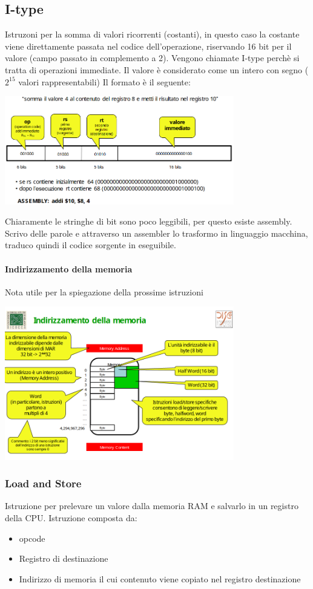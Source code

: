 \documentclass[12pt, a4paper, openany]{book}
\begin{document}
\subsection{I-type}
Istruzoni per la somma di valori ricorrenti (costanti), in questo caso la costante viene direttamente
passata nel codice dell'operazione, riservando 16 bit per il valore (campo passato in complemento a 2).
Vengono chiamate I-type perchè si tratta di operazioni immediate.
Il valore è considerato come un intero con segno ($2^{15}$ valori rappresentabili)
Il formato è il seguente:
\begin{center}
    \includegraphics[width=100mm, scale=0.5]{I-type format.png}
\end{center}
Chiaramente le stringhe di bit sono poco leggibili, per questo esiste assembly.
Scrivo delle parole e attraverso un assembler lo trasformo in linguaggio macchina, traduco
quindi il codice sorgente in eseguibile.
\paragraph{Indirizzamento della memoria} Nota utile per la spiegazione della prossime istruzioni
\begin{center}
    \includegraphics[width=100mm, scale=0.5]{assembly indirizzamento memoria.png}
\end{center}

\subsubsection*{Load and Store}
Istruzione per prelevare un valore dalla memoria RAM e salvarlo in un registro della CPU.
Istruzione composta da:
\begin{itemize}
    \item opcode
    \item Registro di destinazione
    \item Indirizzo di memoria il cui contenuto viene copiato nel registro destinazione
\end{itemize}
\end{document}
